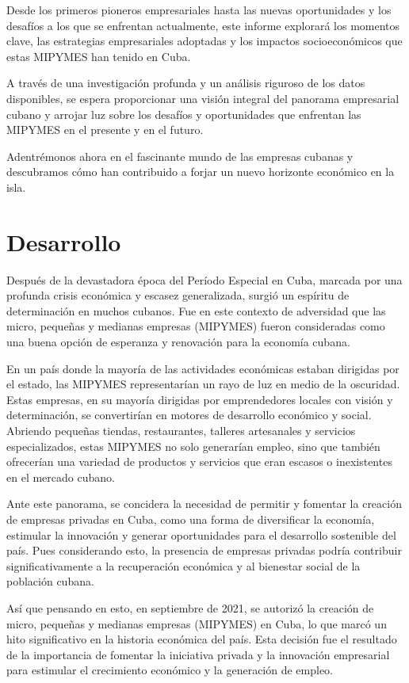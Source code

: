 \documentclass{article}
\begin{document}
	Desde los primeros pioneros empresariales hasta las nuevas oportunidades y los desafíos a los que se enfrentan actualmente, este informe explorará los momentos clave, las estrategias empresariales adoptadas y los impactos socioeconómicos que estas MIPYMES han tenido en Cuba.
	
	A través de una investigación profunda y un análisis riguroso de los datos disponibles, se espera proporcionar una visión integral del panorama empresarial cubano y arrojar luz sobre los desafíos y oportunidades que enfrentan las MIPYMES en el presente y en el futuro.
	
	Adentrémonos ahora en el fascinante mundo de las empresas cubanas y descubramos cómo han contribuido a forjar un nuevo horizonte económico en la isla.
	\newpage
	
	
	\section{Desarrollo}
Después de la devastadora época del Período Especial en Cuba, marcada por una profunda crisis económica y escasez generalizada, surgió un espíritu de determinación en muchos cubanos. Fue en este contexto de adversidad que las micro, pequeñas y medianas empresas (MIPYMES) fueron consideradas como una buena opción de esperanza y renovación para la economía cubana.

En un país donde la mayoría de las actividades económicas estaban dirigidas por el estado, las MIPYMES representarían un rayo de luz en medio de la oscuridad. Estas empresas, en su mayoría dirigidas por emprendedores locales con visión y determinación, se convertirían en motores de desarrollo económico y social. Abriendo pequeñas tiendas, restaurantes, talleres artesanales y servicios especializados, estas MIPYMES no solo generarían empleo, sino que también ofrecerían una variedad de productos y servicios que  eran escasos o inexistentes en el mercado cubano.

Ante este panorama, se concidera la necesidad de permitir y fomentar la creación de empresas privadas en Cuba, como una forma de diversificar la economía, estimular la innovación y generar oportunidades para el desarrollo sostenible del país. Pues considerando esto, la presencia de empresas privadas podría contribuir significativamente a la recuperación económica y al bienestar social de la población cubana.

Así que pensando en esto, en septiembre de 2021, se autorizó la creación de micro, pequeñas y medianas empresas (MIPYMES) en Cuba, lo que marcó un hito significativo en la historia económica del país. Esta decisión fue el resultado de la importancia de fomentar la iniciativa privada y la innovación empresarial para estimular el crecimiento económico y la generación de empleo.
\end{document}
